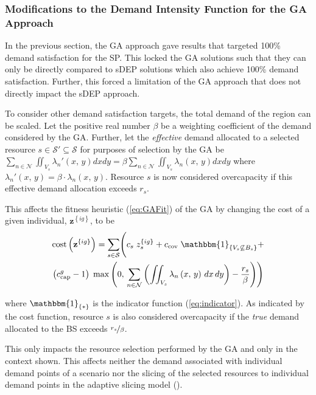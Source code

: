 \documentclass[12pt,dvipsnames]{report}
\newcommand{\ind}[1]{\mathbbm{1}_{\left\{ #1 \right\}}}
\begin{document}
\subsubsection{Modifications to the Demand Intensity Function for the GA Approach}

In the previous section, the GA approach gave results that targeted 100\% demand satisfaction for the SP.  This locked the GA solutions such that they can only be directly compared to sDEP solutions which also achieve 100\% demand satisfaction.  Further, this forced a limitation of the GA approach that does not directly impact the sDEP approach.

To consider other demand satisfaction targets, the total demand of the region can be scaled.  Let the positive real number $\beta$ be a weighting coefficient of the demand considered by the GA.  Further, let the \emph{effective} demand allocated to a selected resource $s \in \mathcal{S}' \subseteq \mathcal{S}$ for purposes of selection by the GA be $\sum_{n \in \mathcal{N}} \iint_{V_s} \lambda_n'\left( x,\, y \right) dx dy = \beta \sum_{n \in \mathcal{N}} \iint_{V_s} \lambda_n\left( x,\, y \right) dx dy$ where $\lambda_n'\left( x,\, y \right) = \beta \cdot \lambda_n\left( x,\, y \right)$.  Resource $s$ is now considered overcapacity if this effective demand allocation exceeds $r_s$.

This affects the fitness heuristic (\cref{eq:GAFit}) of the GA by changing the cost of a given individual, $\textbf{z}^{\left\{ ig \right\}}$, to be
\begin{multline} \label{eq:GAModifiedCost}
\mathrm{cost}\left( \textbf{z}^{\left\{ ig \right\}} \right) = \sum_{s \in \mathcal{S}} \Biggl( c_s \; z_s^{\left\{ ig \right\}} + c_\text{cov} \; \ind{V_s \not\subseteq B_s} + \\ \left( c_\text{cap}^g - 1 \right) \; \max\left( 0,\, \sum_{n \in \mathcal{N}} \left( \iint_{V_s} \lambda_n\left( x,\, y \right)\, dx\, dy \right) - \frac{r_s}{\beta} \right) \Biggr)
\end{multline}

\noindent where $\ind{*}$ is the indicator function (\cref{eq:indicator}).  As indicated by the cost function, resource $s$ is also considered overcapacity if the \emph{true} demand allocated to the BS exceeds $\nicefrac{r_s}{\beta}$.

This only impacts the resource selection performed by the GA and only in the context shown.  This affects neither the demand associated with individual demand points of a scenario nor the slicing of the selected resources to individual demand points in the adaptive slicing model ().
\end{document}
